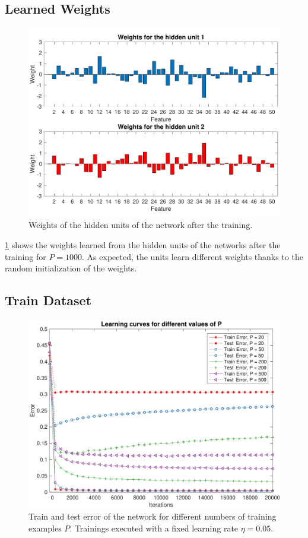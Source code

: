 \subsection{Learned Weights}
\begin{figure}[t]
	\centering
	\includegraphics[width=\columnwidth]{figures/weights_p_1000}
    \caption{Weights of the hidden units of the network after the training.}
	\label{fig:weights}
\end{figure}

\cref{fig:weights} shows the weights learned from the hidden units of the networks after the training for $P = 1000$.
As expected, the units learn different weights thanks to the random initialization of the weights.

\subsection{Train Dataset}
\begin{figure}[t]
	\centering
	\includegraphics[width=\columnwidth]{figures/error_ps}
	\caption{Train and test error of the network for different numbers of training examples $P$. Trainings
	executed with a fixed learning rate $\eta = 0.05$.}
	\label{fig:ps}
\end{figure}

